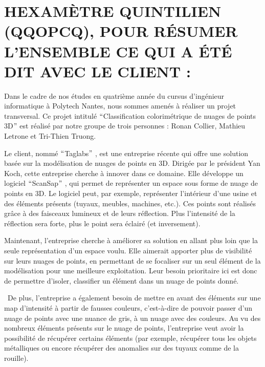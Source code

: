 \documentclass[12pt,titlepage]{report}
\begin{document}
\section{HEXAMÈTRE QUINTILIEN (QQOPCQ), POUR RÉSUMER L’ENSEMBLE CE QUI A ÉTÉ DIT AVEC LE CLIENT :}

\begin{justify}
\tab Dans le cadre de nos études en quatrième année du cursus d’ingénieur informatique à Polytech Nantes, nous sommes amenés à réaliser un projet transversal. Ce projet intitulé $``$Classification colorimétrique de nuages de points 3D$"$  est réalisé par notre groupe de trois personnes : Ronan Collier, Mathieu Letrone et Tri-Thien Truong. 
\end{justify}\par

\begin{justify}
Le client, nommé $``$Taglabs$"$ , est une entreprise récente qui offre une solution basée sur la modélisation de nuages de points en 3D. Dirigée par le président Yan Koch, cette entreprise cherche à innover dans ce domaine. Elle développe un logiciel $``$ScanSap$"$ , qui permet de représenter un espace sous forme de nuage de points en 3D. Le logiciel peut, par exemple, représenter l’intérieur d’une usine et des éléments présents (tuyaux, meubles, machines, etc.). Ces points sont réalisés grâce à des faisceaux lumineux et de leurs réflection. Plus l’intensité de la réflection sera forte, plus le point sera éclairé (et inversement).
\end{justify}\par


\begin{justify}
Maintenant, l’entreprise cherche à améliorer sa solution en allant plus loin que la seule représentation d’un espace voulu. Elle aimerait apporter plus de visibilité sur leurs nuages de points, en permettant de se focaliser sur un seul élément de la modélisation pour une meilleure exploitation. Leur besoin prioritaire ici est donc de permettre d’isoler, classifier un élément dans un nuage de points donné.
\end{justify}\par

\begin{justify}
\  De plus, l’entreprise a également besoin de mettre en avant des éléments sur une map d’intensité à partir de fausses couleurs, c’est-à-dire de pouvoir passer d’un nuage de points avec une nuance de gris, à un nuage avec des couleurs. Au vu des nombreux éléments présents sur le nuage de points, l’entreprise veut avoir la possibilité de récupérer certains éléments (par exemple, récupérer tous les objets métalliques ou encore récupérer des anomalies sur des tuyaux comme de la rouille).
\end{justify}\par
\end{document}
